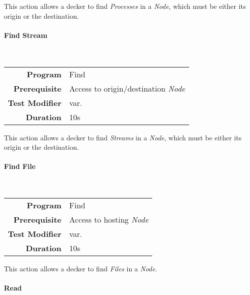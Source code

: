 \hfill

This action allows a decker to find \emph{Processes} in a \emph{Node}, which must be either its
origin or the destination.

\paragraph{Find Stream}
\label{par: find stram}

\mbox{}\\

\begin{tabular}{rl}
    \textbf{Program}       & Find                                     \\
    \textbf{Prerequisite}  & Access to origin/destination \emph{Node} \\
    \textbf{Test Modifier} & var.                                     \\
    \textbf{Duration}      & 10s                                      \\
\end{tabular}

\hfill

This action allows a decker to find \emph{Streams} in a \emph{Node}, which must be either its
origin or the destination.

\paragraph{Find File}
\label{par: find file}

\mbox{}\\

\begin{tabular}{rl}
    \textbf{Program}       & Find                          \\
    \textbf{Prerequisite}  & Access to hosting \emph{Node} \\
    \textbf{Test Modifier} & var.                          \\
    \textbf{Duration}      & 10s                           \\
\end{tabular}

\hfill

This action allows a decker to find \emph{Files} in a \emph{Node}.

\paragraph{Read}
\label{par: read}

